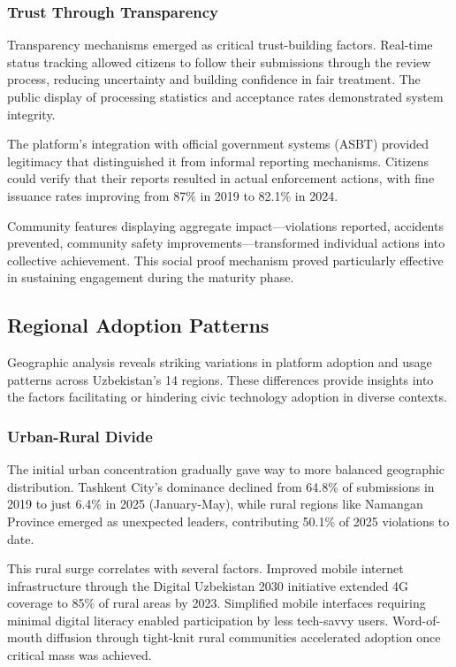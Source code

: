 \documentclass[pdflatex,sn-mathphys-num]{sn-jnl}%
\theoremstyle{thmstyleone}%
\theoremstyle{thmstyletwo}%
\theoremstyle{thmstylethree}%
\begin{document}
\subsubsection{Trust Through Transparency}

Transparency mechanisms emerged as critical trust-building factors. Real-time status tracking allowed citizens to follow their submissions through the review process, reducing uncertainty and building confidence in fair treatment. The public display of processing statistics and acceptance rates demonstrated system integrity.

The platform's integration with official government systems (ASBT) provided legitimacy that distinguished it from informal reporting mechanisms. Citizens could verify that their reports resulted in actual enforcement actions, with fine issuance rates improving from 87\% in 2019 to 82.1\% in 2024.

Community features displaying aggregate impact—violations reported, accidents prevented, community safety improvements—transformed individual actions into collective achievement. This social proof mechanism proved particularly effective in sustaining engagement during the maturity phase.

\subsection{Regional Adoption Patterns}\label{subsec14}

Geographic analysis reveals striking variations in platform adoption and usage patterns across Uzbekistan's 14 regions. These differences provide insights into the factors facilitating or hindering civic technology adoption in diverse contexts.

\subsubsection{Urban-Rural Divide}

The initial urban concentration gradually gave way to more balanced geographic distribution. Tashkent City's dominance declined from 64.8\% of submissions in 2019 to just 6.4\% in 2025 (January-May), while rural regions like Namangan Province emerged as unexpected leaders, contributing 50.1\% of 2025 violations to date.

This rural surge correlates with several factors. Improved mobile internet infrastructure through the Digital Uzbekistan 2030 initiative extended 4G coverage to 85\% of rural areas by 2023. Simplified mobile interfaces requiring minimal digital literacy enabled participation by less tech-savvy users. Word-of-mouth diffusion through tight-knit rural communities accelerated adoption once critical mass was achieved.
\end{document}
